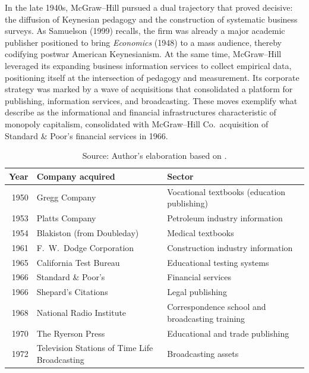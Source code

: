 \documentclass[11pt]{article}
\begin{document}
In the late 1940s, McGraw--Hill pursued a dual trajectory that proved decisive: the diffusion of Keynesian pedagogy and the construction of systematic business surveys. As Samuelson (1999) recalls, the firm was already a major academic publisher positioned to bring \emph{Economics} (1948) to a mass audience, thereby codifying postwar American Keynesianism. At the same time, McGraw--Hill leveraged its expanding business information services to collect empirical data, positioning itself at the intersection of pedagogy and measurement. Its corporate strategy was marked by a wave of acquisitions that consolidated a platform for publishing, information services, and broadcasting. These moves exemplify what \citet{baransweezy1988} describe as the informational and financial infrastructures characteristic of monopoly capitalism, consolidated with McGraw--Hill Co.\ acquisition of Standard \& Poor's financial services in 1966.

\begin{table}[h!]
\centering
\caption{McGraw--Hill Acquisitions, 1950--1972}
\label{tab:mcgrawhill_acquisitions}
\begin{tabular}{rp{4cm}p{5cm}}
\toprule
Year & Company acquired & Sector \\
\midrule
1950 & Gregg Company & Vocational textbooks (education publishing) \\
1953 & Platts Company & Petroleum industry information \\
1954 & Blakiston (from Doubleday) & Medical textbooks \\
1961 & F.\ W.\ Dodge Corporation & Construction industry information \\
1965 & California Test Bureau & Educational testing systems \\
1966 & Standard \& Poor's & Financial services \\
1966 & Shepard's Citations & Legal publishing \\
1968 & National Radio Institute & Correspondence school and broadcasting training \\
1970 & The Ryerson Press & Educational and trade publishing \\
1972 & Television Stations of Time Life Broadcasting & Broadcasting assets \\
\bottomrule
\end{tabular}
\captionsetup{font=small}
\caption*{Source: Author's elaboration based on \citet{munroe2007}.}
\end{table}
\end{document}
